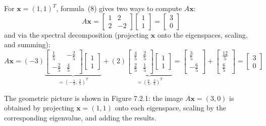 \documentclass{article}
\theoremstyle{mystyle}
\begin{document}
For $\mathbf{x}=(1,1)^T$, formula~(8) gives two ways to compute $A\mathbf{x}$:
\[
  A\mathbf{x} = \begin{bmatrix}1&2\\2&-2\end{bmatrix}\begin{bmatrix}1\\1\end{bmatrix}
              = \begin{bmatrix}3\\0\end{bmatrix}
  \tag{9}
\]
and via the spectral decomposition (projecting $\mathbf{x}$ onto the eigenspaces, scaling, and summing):
\[
  A\mathbf{x} = (-3)\underbrace{\begin{bmatrix}\tfrac{1}{5}&-\tfrac{2}{5}\\-\tfrac{2}{5}&\tfrac{4}{5}\end{bmatrix}
                                 \begin{bmatrix}1\\1\end{bmatrix}}_{=\left(-\tfrac{1}{5},\,\tfrac{2}{5}\right)^T}
              + (2)\underbrace{\begin{bmatrix}\tfrac{4}{5}&\tfrac{2}{5}\\\tfrac{2}{5}&\tfrac{1}{5}\end{bmatrix}
                                \begin{bmatrix}1\\1\end{bmatrix}}_{=\left(\tfrac{6}{5},\,\tfrac{3}{5}\right)^T}
  = \begin{bmatrix}\tfrac{3}{5}\\-\tfrac{6}{5}\end{bmatrix}
  + \begin{bmatrix}\tfrac{12}{5}\\\tfrac{6}{5}\end{bmatrix}
  = \begin{bmatrix}3\\0\end{bmatrix}
  \tag{10}
\]

The geometric picture is shown in Figure 7.2.1: the image $A\mathbf{x}=(3,0)$ is obtained
by projecting $\mathbf{x}=(1,1)$ onto each eigenspace, scaling by the corresponding
eigenvalue, and adding the results.
\end{document}
